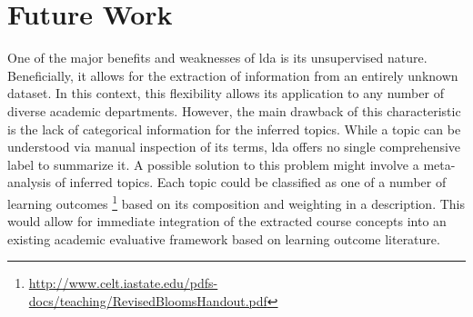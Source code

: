 \section{Future Work}
\label{sec:future-work}


One of the major benefits and weaknesses of \ac{lda} is its unsupervised nature.
Beneficially, it allows for the extraction of information from an entirely unknown dataset.
In this context, this flexibility allows its application to any number of diverse academic departments.
However, the main drawback of this characteristic is the lack of categorical information for the inferred topics.
While a topic can be understood via manual inspection of its terms, \ac{lda} offers no single comprehensive label to summarize it.
A possible solution to this problem might involve a meta-analysis of inferred topics.
Each topic could be classified as one of a number of learning outcomes \footnote{\url{http://www.celt.iastate.edu/pdfs-docs/teaching/RevisedBloomsHandout.pdf}} based on its composition and weighting in a description.
This would allow for immediate integration of the extracted course concepts into an existing academic evaluative framework based on learning outcome literature.


